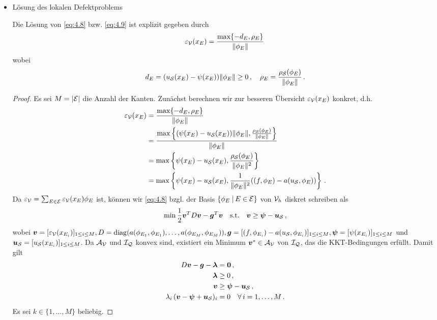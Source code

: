 \begin{itemize}
\item Lösung des lokalen Defektproblems
\begin{satz}
Die Lösung von \eqref{eq:4.8} bzw. \eqref{eq:4.9} ist explizit gegeben durch
\begin{align}\label{eq:4.10}
	\varepsilon_{\mathcal V} (x_E) = \frac{\max \{-d_E,\rho_E\}}{\lVert \phi_E\rVert} \, 
\end{align}
wobei
\begin{align}\label{eq:4.11}
	d_E = (u_{\mathcal S}(x_E) - \psi (x_E))\lVert \phi_E\rVert \ge 0 \, , \quad \rho_E = \frac{\rho_{\mathcal S}(\phi_E)}{\lVert \phi_E\rVert} \, .
\end{align}
\end{satz}

\begin{proof}
Es sei $M = \lvert \mathcal E\rvert$ die Anzahl der Kanten. Zunächst berechnen wir zur besseren Übersicht $\varepsilon_{\mathcal V}(x_E)$ konkret, d.h.
\begin{align}\notag
	\varepsilon_{\mathcal V} (x_E) & =  \frac{\max \{-d_E,\rho_E\}}{\lVert \phi_E\rVert} \\
	\notag
	& = \frac{\max \left\{(\psi (x_E)-u_{\mathcal S}(x_E) )\lVert \phi_E\rVert ,\frac{\rho_{\mathcal S}(\phi_E)}{\lVert \phi_E\rVert}\right\}}{\lVert \phi_E\rVert} \\
	\notag
	& = \max \left\{\psi (x_E)-u_{\mathcal S}(x_E)  ,\frac{\rho_{\mathcal S}(\phi_E)}{\lVert \phi_E\rVert^2}\right\} \\
	\label{eq:4.12}
	& = \max \left\{\psi (x_E)-u_{\mathcal S}(x_E)  ,\frac 1{\lVert \phi_E\rVert^2} ((f,\phi_E)-a(u_{\mathcal S},\phi_E))	\right\} \, .
\end{align}
Da  $\varepsilon_{\mathcal V} = \sum_{E \in \mathcal E} \varepsilon_{\mathcal V}(x_E) \phi_E$ ist, können wir \eqref{eq:4.8} bzgl. der Basis $\{\phi_E \;\vert\, E \in \mathcal E\}$ von $\mathcal V_h$ diskret schreiben als
\begin{align*}
	\min \frac 1 2 \boldsymbol v^T D \boldsymbol v - \boldsymbol g^T \boldsymbol v \quad \text{s.t.} \quad\boldsymbol v \ge \boldsymbol \psi - \boldsymbol u_{\mathcal S}\, , 
\end{align*}
wobei $\boldsymbol v = [\varepsilon_{\mathcal V}(x_{E_i})]_{1\le i \le M}, D = \operatorname{diag}(a(\phi_{E_1},\phi_{E_1}),\ldots,a(\phi_{E_M},\phi_{E_M})), \boldsymbol g = [(f,\phi_{E_i})-a(u_{\mathcal S},\phi_{E_i})]_{1\le i\le M}, \boldsymbol \psi = [\psi(x_{E_i})]_{1\le i \le M}$ und $ \boldsymbol u_{\mathcal S} = [u_{\mathcal S}(x_{E_i})]_{1\le i \le M}$. Da $\mathcal A_{\mathcal V}$ und $\mathcal I_{\mathcal Q}$ konvex sind, existiert ein Minimum $\boldsymbol v^* \in \mathcal A_{\mathcal V}$ von $\mathcal I_{\mathcal Q}$, das die KKT-Bedingungen erfüllt. Damit gilt
\begin{subequations}\label{eq:4.13}
\begin{align}\label{eq:4.13a}
	D \boldsymbol v-\boldsymbol g - \boldsymbol \lambda & = \boldsymbol 0 \, , \\
	\label{eq:4.13b}
	\boldsymbol \lambda &\ge 0\, ,\\
	\label{eq:4.13c}
	\boldsymbol v & \ge \boldsymbol \psi - \boldsymbol u_{\mathcal S}\,  , \\
	\label{eq:4.13d}
	\lambda_i\, (\boldsymbol v - \boldsymbol \psi+\boldsymbol u_{\mathcal S})_i &= 0 \quad \forall \, i=1,\ldots,M \, .
\end{align}
\end{subequations}
Es sei $k \in \{1,\ldots,M\}$ beliebig.


\end{proof}
\end{itemize}
